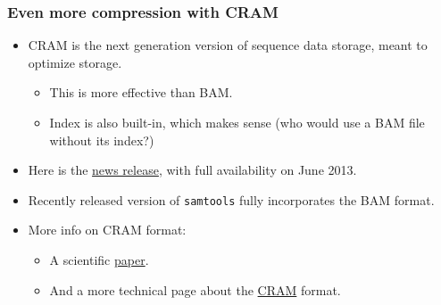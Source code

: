 \documentclass{beamer}
\begin{document}
\begin{frame}
  \frametitle{Even more compression with CRAM}
  \begin{itemize}
  \item CRAM is the next generation version of sequence data storage, meant to optimize storage.
    \begin{itemize}
    \item This is more effective than BAM.
    \item Index is also built-in, which makes sense (who would use a BAM file without its index?)
    \end{itemize}
  \item Here is the \href{http://www.ebi.ac.uk/about/news/service-news/cram-pre-launch}{news release}, with full availability on June 2013.
  \item Recently released version of \texttt{samtools} fully incorporates the BAM format.
  \item More info on CRAM format:
    \begin{itemize}
    \item A scientific \href{http://genome.cshlp.org/content/21/5/734}{paper}.
    \item And a more technical page about the \href{http://www.ebi.ac.uk/ena/about/cram_toolkit}{CRAM} format.
    \end{itemize}
  \end{itemize}
\end{frame}
\end{document}
